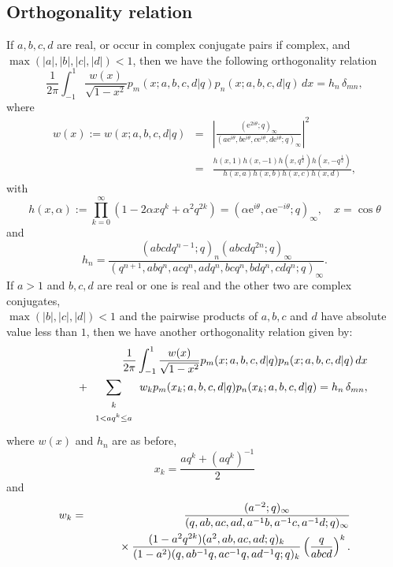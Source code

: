 \documentclass[envcountchap,graybox]{svmono}
\newcommand{\mathindent}{\hspace{7.5mm}}
\newcommand{\e}{\textrm{e}}
\begin{document}
\subsection*{Orthogonality relation}
If $a,b,c,d$ are real, or occur in complex conjugate pairs if complex, and\\
$\max(|a|,|b|,|c|,|d|)<1$, then we have the following orthogonality relation
\begin{equation}
\label{OrtAskeyWilsonI}
\frac{1}{2\pi}\int_{-1}^1\frac{w(x)}{\sqrt{1-x^2}}p_m(x;a,b,c,d|q)p_n(x;a,b,c,d|q)\,dx=h_n\,\delta_{mn},
\end{equation}
where
\begin{eqnarray*}
w(x):=w(x;a,b,c,d|q)&=&\left|\frac{(\e^{2i\theta};q)_{\infty}}{(a\e^{i\theta},b\e^{i\theta},
c\e^{i\theta},d\e^{i\theta};q)_{\infty}}\right|^2\\
&=&\frac{h(x,1)h(x,-1)h(x,q^{\frac{1}{2}})h(x,-q^{\frac{1}{2}})}
{h(x,a)h(x,b)h(x,c)h(x,d)},
\end{eqnarray*}
with
$$h(x,\alpha):=\prod_{k=0}^{\infty}\left(1-2\alpha xq^k+\alpha^2q^{2k}\right)
=\left(\alpha\e^{i\theta},\alpha\e^{-i\theta};q\right)_{\infty},\quad x=\cos\theta$$
and
$$h_n=\frac{(abcdq^{n-1};q)_n(abcdq^{2n};q)_{\infty}}{(q^{n+1},abq^n,acq^n,adq^n,bcq^n,bdq^n,cdq^n;q)_{\infty}}.$$
If $a>1$ and $b,c,d$ are real or one is real and the other two are complex conjugates,\\
$\max(|b|,|c|,|d|)<1$ and the pairwise products of $a,b,c$ and $d$ have
absolute value less than $1$, then we have another orthogonality relation
given by:
\begin{eqnarray}
\label{OrtAskeyWilsonII}
& &\frac{1}{2\pi}\int_{-1}^1\frac{w(x)}{\sqrt{1-x^2}}p_m(x;a,b,c,d|q)p_n(x;a,b,c,d|q)\,dx\nonumber\\
& &{}\mathindent{}+\sum_{\begin{array}{c}\scriptstyle k\\ \scriptstyle 1<aq^k\leq a\end{array}}
w_kp_m(x_k;a,b,c,d|q)p_n(x_k;a,b,c,d|q)=h_n\,\delta_{mn},
\end{eqnarray}
where $w(x)$ and $h_n$ are as before,
$$x_k=\frac{aq^k+\left(aq^k\right)^{-1}}{2}$$
and
\begin{eqnarray*}
w_k&=&\frac{(a^{-2};q)_{\infty}}{(q,ab,ac,ad,a^{-1}b,a^{-1}c,a^{-1}d;q)_{\infty}}\\
& &{}\mathindent\times\frac{(1-a^2q^{2k})(a^2,ab,ac,ad;q)_k}
{(1-a^2)(q,ab^{-1}q,ac^{-1}q,ad^{-1}q;q)_k}\left(\frac{q}{abcd}\right)^k.
\end{eqnarray*}
\end{document}
